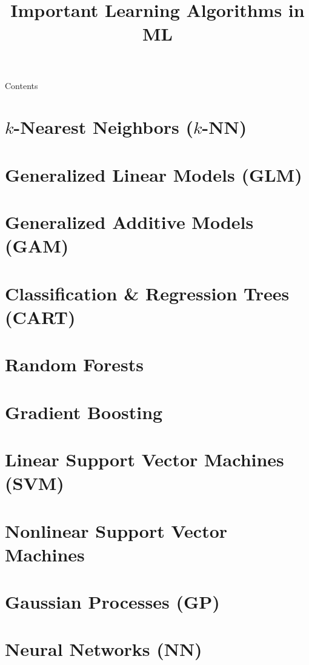 \documentclass[10pt,compress,t,notes=noshow, xcolor=table]{beamer}
\title{Important Learning Algorithms in ML}
\begin{document}

\sloppy

\begin{frame}{Contents}
  \tableofcontents
\end{frame}

\section{$k$-Nearest Neighbors ($k$-NN)}


\section{Generalized Linear Models (GLM)}


\section{Generalized Additive Models (GAM)}


\section{Classification \& Regression Trees (CART)}


\section{Random Forests}


\section{Gradient Boosting}


\section{Linear Support Vector Machines (SVM)}


\section{Nonlinear Support Vector Machines}


\section{Gaussian Processes (GP)}


\section{Neural Networks (NN)}


\endlecture
\end{document}
